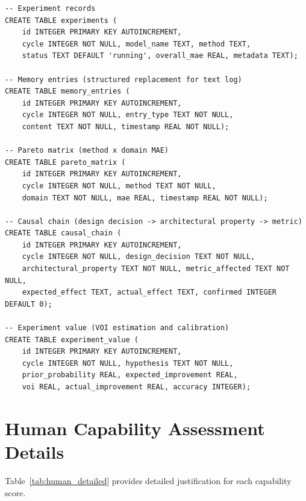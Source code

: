 \documentclass[11pt,a4paper]{article}
\begin{document}
\begin{verbatim}
-- Experiment records
CREATE TABLE experiments (
    id INTEGER PRIMARY KEY AUTOINCREMENT,
    cycle INTEGER NOT NULL, model_name TEXT, method TEXT,
    status TEXT DEFAULT 'running', overall_mae REAL, metadata TEXT);

-- Memory entries (structured replacement for text log)
CREATE TABLE memory_entries (
    id INTEGER PRIMARY KEY AUTOINCREMENT,
    cycle INTEGER NOT NULL, entry_type TEXT NOT NULL,
    content TEXT NOT NULL, timestamp REAL NOT NULL);

-- Pareto matrix (method x domain MAE)
CREATE TABLE pareto_matrix (
    id INTEGER PRIMARY KEY AUTOINCREMENT,
    cycle INTEGER NOT NULL, method TEXT NOT NULL,
    domain TEXT NOT NULL, mae REAL, timestamp REAL NOT NULL);

-- Causal chain (design decision -> architectural property -> metric)
CREATE TABLE causal_chain (
    id INTEGER PRIMARY KEY AUTOINCREMENT,
    cycle INTEGER NOT NULL, design_decision TEXT NOT NULL,
    architectural_property TEXT NOT NULL, metric_affected TEXT NOT NULL,
    expected_effect TEXT, actual_effect TEXT, confirmed INTEGER DEFAULT 0);

-- Experiment value (VOI estimation and calibration)
CREATE TABLE experiment_value (
    id INTEGER PRIMARY KEY AUTOINCREMENT,
    cycle INTEGER NOT NULL, hypothesis TEXT NOT NULL,
    prior_probability REAL, expected_improvement REAL,
    voi REAL, actual_improvement REAL, accuracy INTEGER);
\end{verbatim}

\section{Human Capability Assessment Details}

Table~\ref{tab:human_detailed} provides detailed justification for each capability score.
\end{document}

